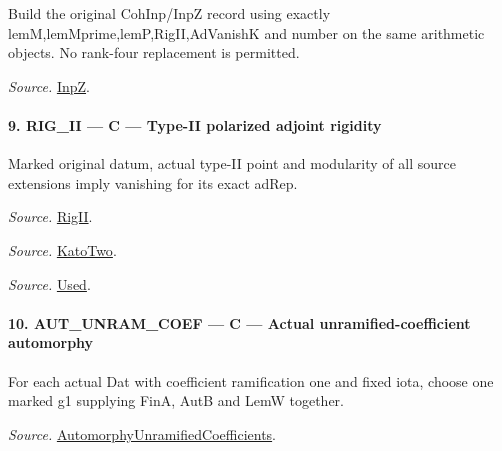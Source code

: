 Build the original CohInp/InpZ record using exactly lemM,lemMprime,lemP,RigII,AdVanishK and number on the same arithmetic objects. No rank-four replacement is permitted.

\emph{Source.} \href{https://github.com/CocoSgt/riemann-hypothesis-lean/blob/7cbf7a0c32fca1badf05931879a37c3f8a2b03b4/src/Development/AutomorphicArithmetic/AutomorphicVarieties/ModularityArgument/KatoQuadraticCharacters/KatoTwoOfUseN.lean#L55-L61}{InpZ}.



\paragraph{9. RIG\_\allowbreak II — C — Type-II polarized adjoint rigidity}

Marked original datum, actual type-II point and modularity of all source extensions imply vanishing for its exact adRep.

\emph{Source.} \href{https://github.com/CocoSgt/riemann-hypothesis-lean/blob/7cbf7a0c32fca1badf05931879a37c3f8a2b03b4/src/Development/AutomorphicArithmetic/AutomorphicVarieties/ModularityArgument/KatoQuadraticCharacters/KatoTwoOfUseN.lean#L49-L53}{RigII}.

\emph{Source.} \href{https://github.com/CocoSgt/riemann-hypothesis-lean/blob/7cbf7a0c32fca1badf05931879a37c3f8a2b03b4/src/Development/AutomorphicArithmetic/AutomorphicVarieties/ModularityArgument/KatoQuadraticCharacters/KatoTwoOfUseN.lean#L43-L47}{KatoTwo}.

\emph{Source.} \href{https://github.com/CocoSgt/riemann-hypothesis-lean/blob/7cbf7a0c32fca1badf05931879a37c3f8a2b03b4/src/Development/AutomorphicArithmetic/AutomorphicVarieties/ModularityArgument/KatoQuadraticCharacters/KatoTwoOfUseN.lean#L11-L41}{Used}.



\paragraph{10. AUT\_\allowbreak UNRAM\_\allowbreak COEF — C — Actual unramified-coefficient automorphy}

For each actual Dat with coefficient ramification one and fixed iota, choose one marked g1 supplying FinA, AutB and LemW together.

\emph{Source.} \href{https://github.com/CocoSgt/riemann-hypothesis-lean/blob/7cbf7a0c32fca1badf05931879a37c3f8a2b03b4/src/Development/AutomorphicArithmetic/AutomorphicVarieties/AutomorphicCases/AutomorphyUnramifiedCoefficients.lean#L24-L27}{AutomorphyUnramifiedCoefficients}.

